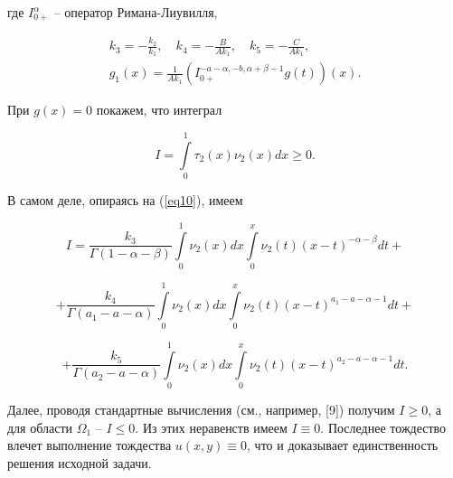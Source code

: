где $I_{0+}^{\alpha}$ -- оператор Римана-Лиувилля,

\begin{equation}

       \label{eq11}{\begin{array}{l}

\displaystyle k_{3}=-\frac{k_{2}}{k_{1}}, \quad k_{4}=-\frac{B}{A k_{1}}, \quad k_{5}= - \frac{C}{A k_{1}}, \\

\displaystyle g_{1}(x) =\frac{1}{A k_{1}} \left( I_{0+}^{-a-\alpha,-b, \alpha+\beta-1} g(t)\right)(x).

\end{array}}

\end{equation}



При $g(x)=0$ покажем, что интеграл

\[

I= \int\limits_{0}^{1}\tau_{2}(x) \nu_{2}(x) dx \geqslant 0.

\]



В самом деле, опираясь на (\ref{eq10}), имеем

\[

I=\frac{k_{3}}{ \Gamma(1-\alpha-\beta)}  \int\limits_{0}^{1} \nu_{2}(x) dx \int\limits_{0}^{x} \nu_{2}(t) (x-t)^{-\alpha-\beta} dt +

 \]

 \[

 + \frac{k_{4}}{ \Gamma(a_{1}-a-\alpha)}  \int\limits_{0}^{1} \nu_{2}(x) dx \int\limits_{0}^{x} \nu_{2}(t) (x-t)^{a_{1}-a-\alpha-1} dt +

\]

\[

+ \frac{k_{5}}{ \Gamma(a_{2}-a-\alpha)}  \int\limits_{0}^{1} \nu_{2}(x) dx \int\limits_{0}^{x} \nu_{2}(t) (x-t)^{a_{2}-a-\alpha-1} dt.

\]



Далее, проводя стандартные вычисления (см., например, [9]) получим $I \geqslant 0$, а для области $\Omega_{1}$ -- $I \leqslant 0$. Из этих неравенств имеем $I \equiv 0$. Последнее тождество влечет выполнение тождества $u(x,y) \equiv 0$, что и доказывает единственность решения исходной задачи.





\bigskip




